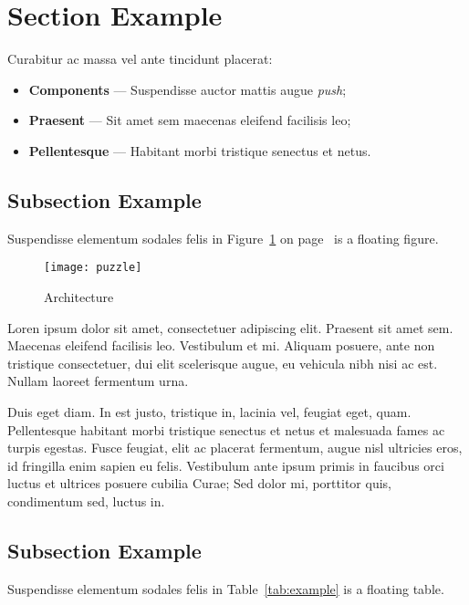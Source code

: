 \section{Section Example} \label{sec:se32}

Curabitur ac massa vel ante tincidunt placerat\parencite{kn:ZPMD97}: 

\begin{itemize}
\item \textbf{Components} --- Suspendisse auctor mattis augue \emph{push};
\item \textbf{Praesent} --- Sit amet sem maecenas eleifend facilisis leo;
\item \textbf{Pellentesque} --- Habitant morbi tristique senectus et netus.
\end{itemize}

\subsection{Subsection Example} \label{sec:se321}

Suspendisse elementum sodales felis in Figure~\ref{fig:arch} on 
page~\pageref{fig:arch} is a floating figure.

\begin{figure}
    \texttt{[image: puzzle]}
    \caption{Architecture}
    \label{fig:arch}
\end{figure}

Loren ipsum dolor sit amet, consectetuer adipiscing elit. 
Praesent sit amet sem. Maecenas eleifend facilisis leo. Vestibulum et
mi. Aliquam posuere, ante non tristique consectetuer, dui elit
scelerisque augue, eu vehicula nibh nisi ac est. Nullam laoreet fermentum urna.

Duis eget diam. In est justo, tristique in, lacinia vel, feugiat eget,
quam. Pellentesque habitant morbi tristique senectus et netus et
malesuada fames ac turpis egestas. Fusce feugiat, elit ac placerat
fermentum, augue nisl ultricies eros, id fringilla enim sapien eu
felis. Vestibulum ante ipsum primis in faucibus orci luctus et
ultrices posuere cubilia Curae; Sed dolor mi, porttitor quis,
condimentum sed, luctus in. 

\subsection{Subsection Example} \label{sec:se322}

Suspendisse elementum sodales felis in Table~\ref{tab:example} is a 
floating table.

